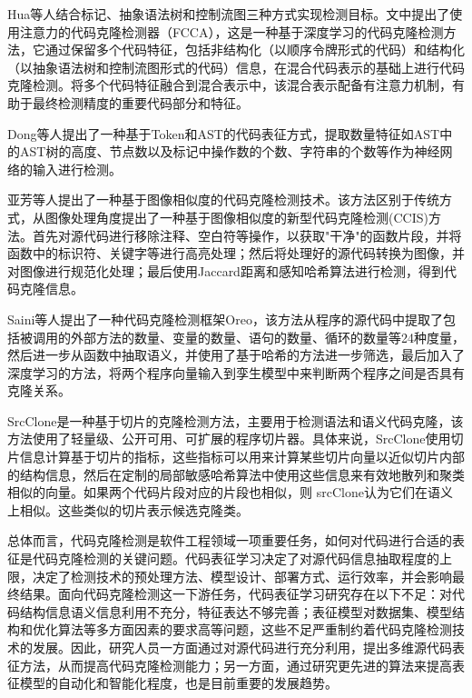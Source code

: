 Hua等人\cite{Hua2020FCCAHC}结合标记、抽象语法树和控制流图三种方式实现检测目标。文中提出了使用注意力的代码克隆检测器（FCCA），这是一种基于深度学习的代码克隆检测方法，它通过保留多个代码特征，包括非结构化（以顺序令牌形式的代码）和结构化（以抽象语法树和控制流图形式的代码）信息，在混合代码表示的基础上进行代码克隆检测。将多个代码特征融合到混合表示中，该混合表示配备有注意力机制，有助于最终检测精度的重要代码部分和特征。

Dong等人\cite{9148302}提出了一种基于Token和AST的代码表征方式，提取数量特征如AST中的AST树的高度、节点数以及标记中操作数的个数、字符串的个数等作为神经网络的输入进行检测。

亚芳等人\cite{王亚芳2020基于图像相似度检测代码克隆}提出了一种基于图像相似度的代码克隆检测技术。该方法区别于传统方式，从图像处理角度提出了一种基于图像相似度的新型代码克隆检测(CCIS)方法。首先对源代码进行移除注释、空白符等操作，以获取"干净"的函数片段，并将函数中的标识符、关键字等进行高亮处理；然后将处理好的源代码转换为图像，并对图像进行规范化处理；最后使用Jaccard距离和感知哈希算法进行检测，得到代码克隆信息。

Saini等人\cite{10.1145/3236024.3236026}提出了一种代码克隆检测框架Oreo，该方法从程序的源代码中提取了包括被调用的外部方法的数量、变量的数量、语句的数量、循环的数量等24种度量，然后进一步从函数中抽取语义，并使用了基于哈希的方法进一步筛选，最后加入了深度学习的方法，将两个程序向量输入到孪生模型中来判断两个程序之间是否具有克隆关系。

SrcClone\cite{ALOMARI2022111115}是一种基于切片的克隆检测方法，主要用于检测语法和语义代码克隆，该方法使用了轻量级、公开可用、可扩展的程序切片器。具体来说，SrcClone使用切片信息计算基于切片的指标，这些指标可以用来计算某些切片向量以近似切片内部的结构信息，然后在定制的局部敏感哈希算法中使用这些信息来有效地散列和聚类相似的向量。如果两个代码片段对应的片段也相似，则 srcClone认为它们在语义上相似。这些类似的切片表示候选克隆类。

总体而言，代码克隆检测是软件工程领域一项重要任务，如何对代码进行合适的表征是代码克隆检测的关键问题。代码表征学习决定了对源代码信息抽取程度的上限，决定了检测技术的预处理方法、模型设计、部署方式、运行效率，并会影响最终结果。面向代码克隆检测这一下游任务，代码表征学习研究存在以下不足：对代码结构信息语义信息利用不充分，特征表达不够完善；表征模型对数据集、模型结构和优化算法等多方面因素的要求高等问题，这些不足严重制约着代码克隆检测技术的发展。因此，研究人员一方面通过对源代码进行充分利用，提出多维源代码表征方法，从而提高代码克隆检测能力；另一方面，通过研究更先进的算法来提高表征模型的自动化和智能化程度，也是目前重要的发展趋势。

